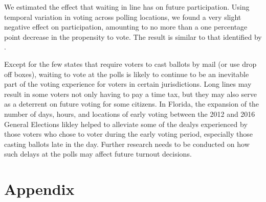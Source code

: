 \documentclass[12pt,titlepage]{article}
\begin{document}
We estimated the effect that waiting in line has on future
participation.  Using temporal variation in voting across polling
locations, we found a very slight negative effect on participation,
amounting to no more than a one percentage point decrease in the
propensity to vote. The result is similar to that identified by
\citet{pettigrew:racegapwaittimes}.

Except for the few states that require voters to cast ballots by mail
(or use drop off boxes), waiting to vote at the polls is likely to
continue to be an inevitable part of the voting experience for voters
in certain jurisdictions. Long lines may result in some voters not
only having to pay a time tax, but they may also serve as a deterrent
on future voting for some citizens. In Florida, the expansion of the
number of days, hours, and locations of early voting between the 2012
and 2016 General Elections likley helped to alleviate some of the
dealys experienced by those voters who chose to voter during the early
voting period, especially those casting ballots late in the day.
Further research needs to be conducted on how such delays at the polls
may affect future turnout decisions.



% 

\clearpage
\newpage





\newpage
\appendix
\section*{Appendix}

 
\end{document}
